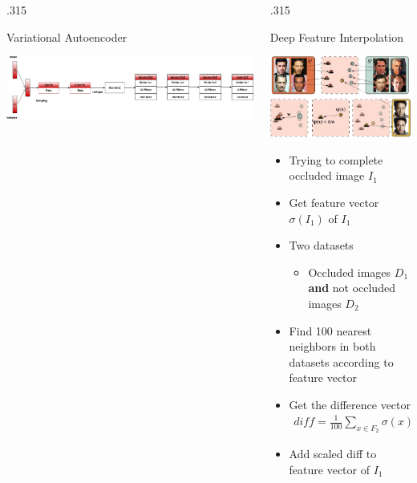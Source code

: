 \documentclass{beamer}
\newcommand{\columnWidth}{.315}
\begin{document}
\begin{frame}[fragile]
\begin{columns}[T]
\begin{column}{\columnWidth\textwidth}
\begin{block}{Variational Autoencoder}
\begin{itemize}
\begin{center}
          \includegraphics[width=.90\textwidth]{cifar10_decoder.png}
      \end{center}
\end{itemize}
\end{block}
\end{column}
\begin{column}{\columnWidth\textwidth}


\begin{block}{Deep Feature Interpolation}
\begin{center}
	\includegraphics[width=.8\textwidth]{dfi.PNG}
\end{center}
\begin{itemize}
	\item Trying to complete occluded image $I_1$
	\item Get feature vector $\sigma (I_1)$ of $I_1$
	\item Two datasets
    \begin{itemize}
        \item Occluded images $D_1$ \textbf{and} not occluded images $D_2$
    \end{itemize}
    \item Find 100 nearest neighbors in both datasets according to feature vector
    \item Get the difference vector
    \begin{align*}
    	diff = \frac{1}{100} \sum_{x \in F_{2}} \sigma(x) - \frac{1}{100} \sum_{x \in F_{1}} \sigma(x)
    \end{align*}
    \item Add scaled diff to feature vector of $I_1$

\end{itemize}
\end{block}
\end{column}
\end{columns}
\end{frame}
\end{document}
